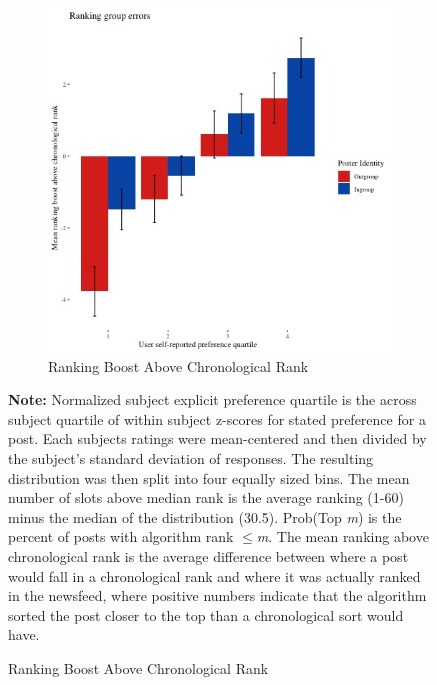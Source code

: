\documentclass[12pt,letterpaper]{article}
\begin{document}
\begin{figure}[ht]
\begin{subfigure}{.5\textwidth}
        \includegraphics[width=1\linewidth]{Output/Graphs/Audit/Misranking relative to expectation/Chronological expectation/US NF by norm preference.jpg}  
        \caption{Ranking Boost Above Chronological Rank}
        \label{fig:nf_rankingboost}
    \end{subfigure}

\footnotesize \textbf{Note:} Normalized subject explicit preference quartile is the across subject quartile of within subject z-scores for stated preference for a post. Each subjects ratings were mean-centered and then divided by the subject's standard deviation of responses. The resulting distribution was then split into four equally sized bins. The mean number of slots above median rank is the average ranking (1-60) minus the median of the distribution (30.5). Prob(Top \textit{m}) is the percent of posts with algorithm rank $\le$\textit{m}. The mean ranking above chronological rank is the average difference between where a post would fall in a chronological rank and where it was actually ranked in the newsfeed, where positive numbers indicate that the algorithm sorted the post closer to the top than a chronological sort would have.
\end{figure}

\end{document}
